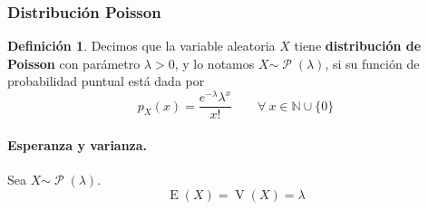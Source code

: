 \documentclass[11pt]{article}
\theoremstyle{plain}
\theoremstyle{definition}
\newtheorem*{defi}{Definición}
\theoremstyle{remark}
\newcommand{\deft}[1]{\textbf{#1}}  %
\newcommand{\esp}[0]{\ensuremath{\operatorname{E}}}  %
\newcommand{\var}[0]{\ensuremath{\operatorname{V}}}  %
\newcommand{\foralle}{\ensuremath{\forall \ }}  %
\newcommand{\dist}[1]{\ensuremath{\sim \operatorname{#1}}}  %
\newcommand{\poisson}[0]{\ensuremath{\mathcal{P}}}  %
\begin{document}
    \subsubsection{Distribución Poisson}
      \begin{defi}
        Decimos que la variable aleatoria $X$ tiene \deft{distribución de Poisson} con parámetro $\lambda > 0$, y lo notamos $X \dist{\poisson}(\lambda)$, si su función de probabilidad puntual está dada por
        \[ p_X(x) = \frac{e^{-\lambda} \lambda^x}{x!} \qquad \foralle x \in \mathbb{N} \cup \lbrace 0 \rbrace \]
      \end{defi}

      \paragraph{Esperanza y varianza.}
      Sea $X \dist{\poisson}(\lambda)$.
      \[ \esp(X) = \var(X) = \lambda \]
\end{document}
